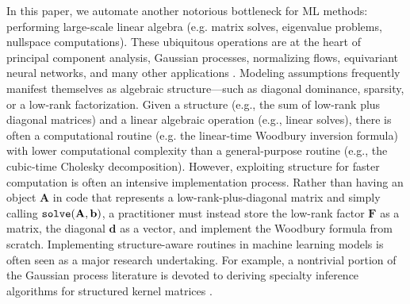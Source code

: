\documentclass{article}
\newcommand{\mbf}[1]{{\boldsymbol{\mathbf{#1}}}}
\renewcommand{\bm}{\mbf}
\begin{document}
In this paper, we automate another notorious bottleneck for ML methods: performing large-scale linear algebra (e.g. matrix solves, eigenvalue problems, nullspace computations).
These ubiquitous operations are at the heart of principal component analysis, Gaussian processes, normalizing flows, equivariant neural networks, and many other applications
\citep{anil2020shampoo, cuturi2013sinkhorn, dao2019butterfly, finzi2023nivp, fu2023hippos, kovachi2021neuraloperator, li2018intrinsic, martens2015optimizing, nguyen2022s4nd, perez2018film}.
Modeling assumptions frequently manifest themselves as algebraic structure---such as diagonal dominance, sparsity, or a low-rank factorization.
Given a structure (e.g., the sum of low-rank plus diagonal matrices) and a linear algebraic operation (e.g., linear solves),
there is often a computational routine (e.g. the linear-time Woodbury inversion formula) with lower computational complexity than a general-purpose routine (e.g., the cubic-time Cholesky decomposition).
However, exploiting structure for faster computation is often an intensive implementation process.
Rather than having an object $\bm{A}$ in code that represents a low-rank-plus-diagonal matrix and simply calling ${\tt solve}(\bm{A}, \bm{b})$,
a practitioner must instead store the low-rank factor $\bm{F}$ as a matrix, the diagonal $\bm{d}$ as a vector, and implement the Woodbury formula from scratch.
Implementing structure-aware routines in machine learning models is often seen as a major research undertaking.
For example, a nontrivial portion of the Gaussian process literature is devoted to deriving specialty inference algorithms
for structured kernel matrices
\citep[e.g.][]{bonilla2007multitask,cunningham2008fast,gardner2018product,katzfuss2021general,loper2021general,snelson2005sparse,wilson2015kernel,wilson2014fast,kapoor2021skiing}.
\end{document}
